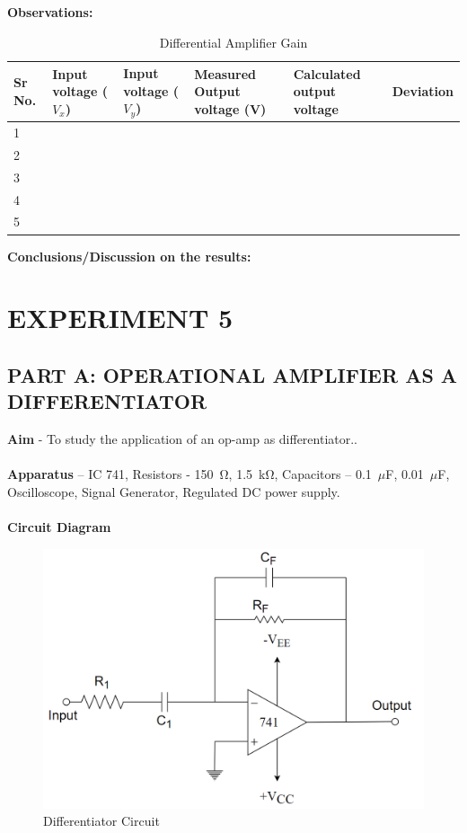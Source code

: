 \documentclass[9pt]{scrreprt}
\begin{document}
\textbf{Observations:}

\begin{table}[H]
\centering
\caption{Differential Amplifier Gain}
\begin{tabularx}{\textwidth}{|p{0.5cm}|X|X|X|X|X|}
\hline
\textbf{Sr No.} & \textbf{Input voltage ($V_x$)} & \textbf{Input voltage ($V_y$)} & \textbf{Measured Output voltage (V)} & \textbf{Calculated output voltage} & \textbf{Deviation} \\ \hline
1 &   &   &   &   &   \\ \hline
2 &   &   &   &   &   \\ \hline
3 &   &   &   &   &   \\ \hline
4 &   &   &   &   &   \\ \hline
5 &   &   &   &   &   \\ \hline
\end{tabularx}
\label{tab:Differential Amplifier Gain}
\end{table}

\textbf{Conclusions/Discussion on the results:}

\newpage

\chapter*{\Large EXPERIMENT 5}
\setcounter{chapter}{5}
\setcounter{table}{0}
\setcounter{figure}{0}
\section*{\normalsize PART A: OPERATIONAL AMPLIFIER AS A DIFFERENTIATOR}
\textbf{Aim} - To study the application of an op-amp as differentiator..\\
\\
\textbf{Apparatus} – IC 741, Resistors - 150~$\si{\ohm}$, 1.5~k$\si{\ohm}$, Capacitors – 0.1~$\mu$F, 0.01~$\mu$F, Oscilloscope, Signal Generator, Regulated DC power supply.\\
\\
\textbf{Circuit Diagram}

\begin{figure}[H]
	\centering
	\includegraphics[width=0.5\linewidth]{logos/Differentor_circuit.png}
	\caption{Differentiator Circuit}
	\label{fig:Differentor_circuit}
\end{figure}
\end{document}
